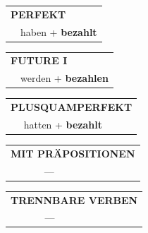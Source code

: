 \documentclass[10pt,a4paper]{revtex4-2}
\begin{document}
\begin{verbbox-acc}
    \vspace{10pt}

 \begin{tabular}{rl}
     \multicolumn{2}{l}{\textbf{PERFEKT}}\\
  &  haben + \textbf{bezahlt}\\
  \end{tabular}
\hfill
   \begin{tabular}{rl}
   
    \multicolumn{2}{l}{\textbf{FUTURE I} }\\
  &  werden + \textbf{bezahlen}\\
 
  \end{tabular}
\hfill
   \begin{tabular}{rl}
      \multicolumn{2}{l}{\textbf{PLUSQUAMPERFEKT}}\\
  &  hatten + \textbf{bezahlt}\\
  \end{tabular}
  
  \vspace{10pt}

\begin{tabular}{lll}
\multicolumn{3}{l}{\textbf{MIT PRÄPOSITIONEN}}\\
& ---\\
\end{tabular}
\hfill
\begin{tabular}{lll}
\multicolumn{3}{l}{\textbf{TRENNBARE VERBEN}}\\
& ---\\
\end{tabular}

\vspace{-5pt}


\end{verbbox-acc}
\end{document}
